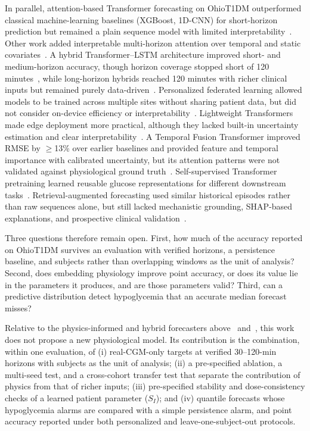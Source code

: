 \documentclass[journal]{IEEEtran}
\begin{document}
In parallel, attention-based Transformer forecasting on OhioT1DM outperformed classical machine-learning baselines (XGBoost, 1D-CNN) for short-horizon prediction but remained a plain sequence model with limited interpretability~\cite{ref19}. Other work added interpretable multi-horizon attention over temporal and static covariates~\cite{ref20}. A hybrid Transformer--LSTM architecture improved short- and medium-horizon accuracy, though horizon coverage stopped short of 120 minutes~\cite{ref21}, while long-horizon hybrids reached 120 minutes with richer clinical inputs but remained purely data-driven~\cite{ref22}. Personalized federated learning allowed models to be trained across multiple sites without sharing patient data, but did not consider on-device efficiency or interpretability~\cite{ref24}. Lightweight Transformers made edge deployment more practical, although they lacked built-in uncertainty estimation and clear interpretability~\cite{ref25}. A Temporal Fusion Transformer improved RMSE by $\geq$13\% over earlier baselines and provided feature and temporal importance with calibrated uncertainty, but its attention patterns were not validated against physiological ground truth~\cite{ref26}. Self-supervised Transformer pretraining learned reusable glucose representations for different downstream tasks~\cite{ref27}. Retrieval-augmented forecasting used similar historical episodes rather than raw sequences alone, but still lacked mechanistic grounding, SHAP-based explanations, and prospective clinical validation~\cite{ref29}.


Three questions therefore remain open. First, how much of the accuracy reported on OhioT1DM survives an evaluation with verified horizons, a persistence baseline, and subjects rather than overlapping windows as the unit of analysis? Second, does embedding physiology improve point accuracy, or does its value lie in the parameters it produces, and are those parameters valid? Third, can a predictive distribution detect hypoglycemia that an accurate median forecast misses?

Relative to the physics-informed and hybrid forecasters above~\cite{ref9,ref11,ref12} and~\cite{ref58}, this work does not propose a new physiological model. Its contribution is the combination, within one evaluation, of (i) real-CGM-only targets at verified 30--120-min horizons with subjects as the unit of analysis; (ii) a pre-specified ablation, a multi-seed test, and a cross-cohort transfer test that separate the contribution of physics from that of richer inputs; (iii) pre-specified stability and dose-consistency checks of a learned patient parameter ($S_I$); and (iv) quantile forecasts whose hypoglycemia alarms are compared with a simple persistence alarm, and point accuracy reported under both personalized and leave-one-subject-out protocols.
\end{document}
